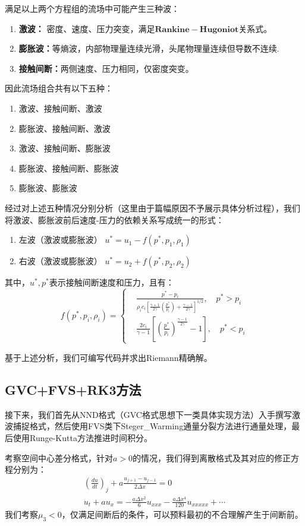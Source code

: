 \documentclass[12pt,a4paper]{article}%
\begin{document}
		满足以上两个方程组的流场中可能产生三种波：
		\begin{enumerate}
		 	\item \textbf{激波：} 密度、速度、压力突变，满足$\mathbf{Rankine-Hugoniot}$关系式。
		 	\item \textbf{膨胀波：}等熵波，内部物理量连续光滑，头尾物理量连续但导数不连续.
		 	\item \textbf{接触间断：}两侧速度、压力相同，仅密度突变。
		\end{enumerate}
		
		因此流场组合共有以下五种：
		\begin{enumerate}
			\item 激波、接触间断、激波
			\item 膨胀波、接触间断、激波
			\item 激波、接触间断、膨胀波
			\item 膨胀波、接触间断、膨胀波
			\item 膨胀波、膨胀波
		\end{enumerate}
		
		经过对上述五种情况分别分析（这里由于篇幅原因不予展示具体分析过程），我们将激波、膨胀波前后速度-压力的依赖关系写成统一的形式：
		\begin{enumerate}
		 	\item 左波（激波或膨胀波） $u^* = u_1 - f(p^*,p_1,\rho_1)$
		 	\item 右波（激波或膨胀波） $u^* = u_2 + f(p^*,p_2,\rho_2)$
		\end{enumerate}
		其中，$u^*,p^*$表示接触间断速度和压力，且有：
		\[
		f(p^*,p_i,\rho_i) = 
		\left\{
		\begin{aligned}
		 	& \frac{p^* - p_i}{\rho_i c_i[\frac{\gamma+1}{2\gamma} (\frac{p^*}{p_i}) + \frac{\gamma-1}{2\gamma}]^{1/2}},\quad p^*>p_i \\
		 	& \frac{2c_i}{\gamma-1}[(\frac{p^*}{p_i})^{\frac{\gamma-1}{2\gamma}} - 1],\quad p^*<p_i
		\end{aligned}
		\right.
		\]
		
		基于上述分析，我们可编写代码并求出Riemann精确解。
		 
		\subsection{GVC+FVS+RK3方法}
		接下来，我们首先从NND格式（GVC格式思想下一类具体实现方法）入手撰写激波捕捉格式，然后使用FVS类下Steger\_Warming通量分裂方法进行通量处理，最后使用Runge-Kutta方法推进时间积分。
		
		考察空间中心差分格式，针对$a>0$的情况，我们得到离散格式及其对应的修正方程分别为：
		\begin{gather}
			(\frac{du}{dt})_j + a\frac{u_{j+1}-u_{j-1}}{2\Delta x} = 0 \\
			u_t + au_x = -\frac{a\Delta x^2}{6}u_{xxx} - \frac{a\Delta x^4}{120}u_{xxxxx}+\cdots
		\end{gather}
		我们考察$\mu_3<0$，仅满足间断后的条件，可以预料最初的不合理解产生于间断前。
		
\end{document}
